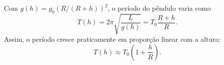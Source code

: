 Com $g(h)=g_0 (R/(R+h))^{2}$, o período do pêndulo varia como
\[
T(h)=2\pi\sqrt{\frac{L}{g(h)}} = T_0\frac{R+h}{R}.
\]
Assim, o período cresce praticamente em proporção linear com a altura:
\[
T(h) \approx T_0\left(1 + \frac{h}{R}\right).
\]